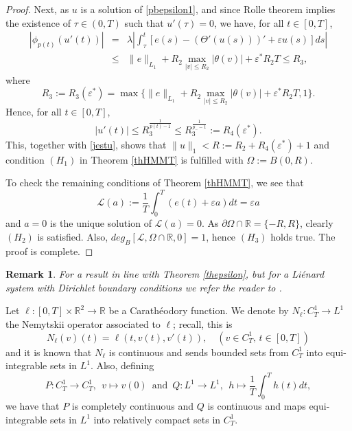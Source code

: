 \documentclass[11pt]{amsart}
\newtheorem{remark}[theorem]{Remark}
\numberwithin{equation}{section} \textwidth=15.5cm
\begin{document}
\begin{proof}
Next, as $u$ is a solution of \eqref{pbepsilon1}, and since Rolle theorem implies the existence of  $\tau \in (0,T)$ such that $u'(\tau) = 0$, we have, for all $t \in [0,T]$,
\begin{eqnarray*}
|\phi_{p(t)}(u'(t))| &=& \lambda \left |\int_\tau^t  [e(s) - (\Theta'(u(s)))' + \varepsilon u(s)]ds \right| \\
&\leq& \|e \|_{L_1} + R_2 \max_{|v| \leq R_2}|\theta(v)| + \varepsilon^* R_2 T\leq  R_3,
\end{eqnarray*}
where
$$R_3 := R_3(\varepsilon^*) = \max\{\|e\|_{L_1} + R_2 \max_{|v| \leq R_2}|\theta(v)| + \varepsilon^* R_2T, 1\}.$$
Hence, for all $t \in [0,T]$,
\begin{equation}\label{jestudot}
|u'(t)| \leq R_3^{\frac{1}{p(t)-1}} \leq R_3^{\frac{1}{p_- - 1}} := R_4(\varepsilon^*).
\end{equation}
This, together with \eqref{jestu}, shows that $\|u\|_1<R:=R_2+R_4(\varepsilon^*)+1$ and condition $(H_1)$ in Theorem \ref{thHMMT} is fulfilled with $\Omega:=B(0,R)$.

To check the remaining conditions of Theorem \ref{thHMMT}, we see that
$$\mathcal{L}(a):=\frac{1}{T}\int_0^T(e(t)+\varepsilon a)dt=\varepsilon a$$
and $a=0$ is the unique solution of $\mathcal{L}(a)=0$. As $\partial \Omega \cap \mathbb{R}=\{ -R, R \}$, clearly $(H_2)$  is satisfied. Also,  $deg_B[\mathcal{L},\Omega\cap\mathbb{R},0]=1$, hence $(H_3)$ holds true.
The proof is complete.
\end{proof}

\begin{remark}\label{remarkDir} \emph{For a result in line with Theorem \ref{thepsilon}, but for a Li\'{e}nard system with Dirichlet boundary conditions we refer the reader to \cite[Theorem 5.1]{[HMMT1]}.}
\end{remark}

Let $\ell:[0,T]\times\mathbb{R}^2\to\mathbb{R}$ be a Carath\'{e}odory function. We denote by $N_\ell:C_T^1\to L^1$ the Nemytskii operator
associated to $\ell$; recall, this is
$$N_\ell(v)(t)=\ell(t,v(t),v'(t)), \quad (v\in C_T^1, \, t\in [0,T])$$
and it is known that $N_\ell$ is continuous and sends bounded sets from $C_T^1$  into equi-integrable sets in $L^1$. Also, defining
$$P:C_T^1\to C_T^1,\ \ v\mapsto v(0) \, \mbox{ and }\, Q:L^1\to L^1,\ \ h\mapsto\frac{1}{T}\int_0^T h(t)dt,$$
we have that $P$ is completely continuous and $Q$ is continuous and maps equi-integrable sets in $L^1$ into relatively compact sets in $C_T^1$.
\medskip
\end{document}
